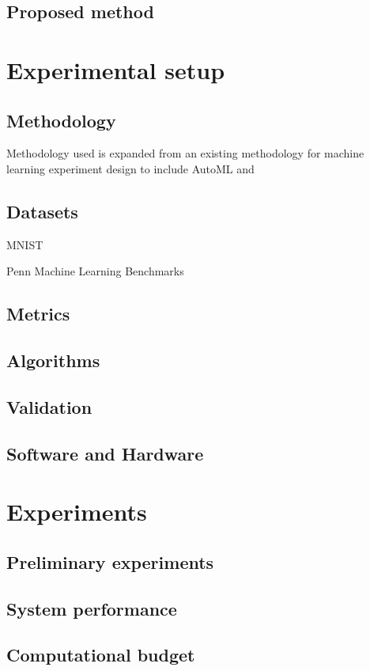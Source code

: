 \subsection{Proposed method}




\section{Experimental setup}

\subsection{Methodology}
Methodology used is expanded from an existing methodology for machine learning experiment design \parencite{fernandez-lozanoMethodologyDesignExperiments2016} to include AutoML and
\subsection{Datasets}
MNIST \parencite{dengMNISTDatabaseHandwritten2012}

Penn Machine Learning Benchmarks \parencite{olsonPMLBLargeBenchmark2017}
\subsection{Metrics}
\subsection{Algorithms}
\subsection{Validation}
\subsection{Software and Hardware}


\section{Experiments}
\label{sec:experiments}

\subsection{Preliminary experiments}
\subsection{System performance}
\subsection{Computational budget}

